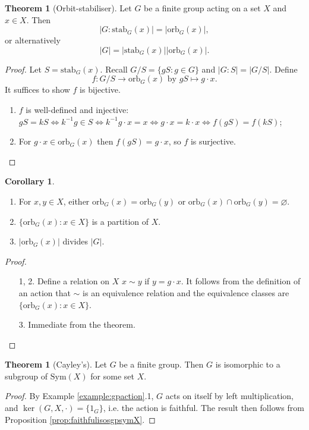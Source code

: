 \documentclass[a4paper]{article}
\newcommand{\orb}{\text{orb}}
\newcommand{\stab}{\text{stab}}
\newcommand{\Sym}{\text{Sym}}
\theoremstyle{definition}
\newtheorem{thm}[defn]{Theorem}
\newtheorem{coro}[defn]{Corollary}
\begin{document}
\begin{thm}[Orbit-stabiliser]
Let $G$ be a finite group acting on a set $X$ and $x\in X$. Then
\[
|G:\stab_G(x)|=|\orb_G(x)|,
\]
or alternatively
\[
|G|=|\stab_G(x)||\orb_G(x)|.
\]
\end{thm}
\begin{proof}
Let $S=\stab_G(x)$. Recall $G/S=\{gS:g\in G\}$ and $|G:S|=|G/S|$. Define
\[
f:G/S\rightarrow\orb_G(x) \text{ by } gS\mapsto g\cdot x.
\]
It suffices to show $f$ is bijective.
\begin{enumerate}
\item $f$ is well-defined and injective: $gS=kS\Leftrightarrow k^{-1}g\in S \Leftrightarrow k^{-1}g\cdot x=x \Leftrightarrow g\cdot x=k\cdot x\Leftrightarrow f(gS)=f(kS)$;
\item For $g\cdot x\in\orb_G(x)$ then $f(gS)=g\cdot x$, so $f$ is surjective.
\end{enumerate}
\end{proof}

\begin{coro}
\label{coro:orbpartitionX}
\begin{enumerate}
\item For $x,y\in X$, either $\orb_G(x)=\orb_G(y)$ or $\orb_G(x)\cap \orb_G(y)=\varnothing$.
\item $\{\orb_G(x):x\in X\}$ is a partition of $X$.
\item $|\orb_G(x)|$ divides $|G|$.
\end{enumerate}
\end{coro}
\begin{proof}
\begin{enumerate}
\item[1, 2.] Define a relation on $X$ $x\sim y$ if $y=g\cdot x$. It follows from the definition of an action that $\sim$ is an equivalence relation and the equivalence classes are $\{\orb_G(x):x\in X\}$.
\item[3.] Immediate from the theorem.
\end{enumerate}
\end{proof}

\begin{thm}[Cayley's]
Let $G$ be a finite group. Then $G$ is isomorphic to a subgroup of $\Sym(X)$ for some set $X$.
\end{thm}
\begin{proof}
By Example \ref{example:gpaction}.1, $G$ acts on itself by left multiplication, and $\ker(G,X,\cdot)=\{1_G\}$, i.e. the action is faithful. The result then follows from Proposition \ref{prop:faithfulisosgpsymX}.
\end{proof}
\end{document}
